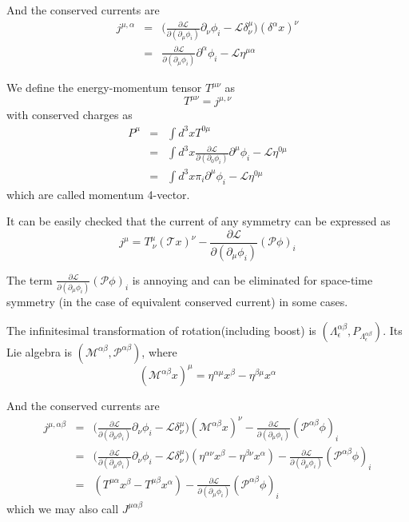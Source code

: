 \documentclass[12pt]{book}
\begin{document}
	And the conserved currents are
	\begin{eqnarray}
		j^{\mu,\alpha}&=&\Big(\frac{\partial\mathcal{L}}{\partial(\partial_\mu\phi_i)}\partial_\nu\phi_i-\mathcal{L}\delta^\mu_\nu\Big)(\delta^\alpha x)^\nu\\
		&=&\frac{\partial\mathcal{L}}{\partial(\partial_\mu\phi_i)}\partial^\alpha\phi_i-\mathcal{L}\eta^{\mu\alpha}
	\end{eqnarray}
	
	We define the energy-momentum tensor $T^{\mu\nu}$ as 
	\begin{equation}
		T^{\mu\nu}=j^{\mu,\nu}
	\end{equation}
	with conserved charges as
	\begin{eqnarray}
		P^\mu&=&\int d^3xT^{0\mu}\\
		&=&\int d^3x \frac{\partial\mathcal{L}}{\partial(\partial_0\phi_i)}\partial^\mu\phi_i-\mathcal{L}\eta^{0\mu}\\
		&=&\int d^3x \pi_i\partial^\mu\phi_i-\mathcal{L}\eta^{0\mu}
	\end{eqnarray}	
	which are called  momentum 4-vector.
	
	It can be easily checked that the current of any symmetry can be expressed as
	\begin{equation}
		j^\mu=T^\mu_{\ \nu}(\mathcal Tx)^\nu-\frac{\partial\mathcal{L}}{\partial(\partial_\mu\phi_i)}(\mathcal P\phi)_i
	\end{equation}
	
	The term $\frac{\partial\mathcal{L}}{\partial(\partial_\mu\phi_i)}(\mathcal P\phi)_i$ is annoying and can be eliminated for space-time symmetry (in the case of equivalent conserved current) in some cases.
	
	The infinitesimal transformation of rotation(including boost) is $(\Lambda_\epsilon^{\alpha\beta},P_{\Lambda_\epsilon^{\alpha\beta}})$. Its Lie algebra is $(\mathcal M^{\alpha\beta},\mathcal P^{\alpha\beta})$, where
	\begin{equation}
		(\mathcal M^{\alpha\beta} x)^\mu=\eta^{\alpha\mu}x^\beta-\eta^{\beta\mu}x^\alpha
	\end{equation}
	
	And the conserved currents are
	\begin{eqnarray}
		j^{\mu,\alpha\beta}&=&\Big(\frac{\partial\mathcal{L}}{\partial(\partial_\mu\phi_i)}\partial_\nu\phi_i-\mathcal{L}\delta^\mu_\nu\Big)(\mathcal M^{\alpha\beta} x)^\nu-\frac{\partial\mathcal{L}}{\partial(\partial_\mu\phi_i)}(\mathcal P^{\alpha\beta}\phi)_i\\
		&=&\Big(\frac{\partial\mathcal{L}}{\partial(\partial_\mu\phi_i)}\partial_\nu\phi_i-\mathcal{L}\delta^\mu_\nu\Big)(\eta^{\alpha\nu}x^\beta-\eta^{\beta\nu}x^\alpha)-\frac{\partial\mathcal{L}}{\partial(\partial_\mu\phi_i)}(\mathcal P^{\alpha\beta}\phi)_i\\
		&=&(T^{\mu\alpha}x^\beta-T^{\mu\beta}x^\alpha)-\frac{\partial\mathcal{L}}{\partial(\partial_\mu\phi_i)}(\mathcal P^{\alpha\beta}\phi)_i \label{eqn:agu_momen}
	\end{eqnarray}
	which we may also call $J^{\mu\alpha\beta}$
	
\end{document}

